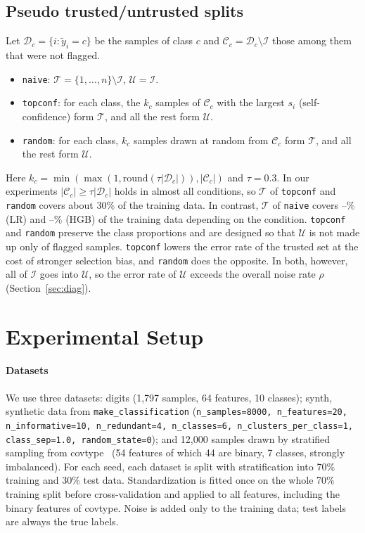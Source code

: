 \documentclass[a4paper,10pt]{article}
\newcommand{\method}[1]{\texttt{#1}}
\begin{document}
\subsection{Pseudo trusted/untrusted splits}\label{sec:split}
Let $\mathcal{D}_c = \{i : \tilde{y}_i = c\}$ be the samples of class $c$ and $\mathcal{C}_c = \mathcal{D}_c \setminus \mathcal{I}$ those among them that were not flagged.
\begin{itemize}
  \item \method{naive}: $\mathcal{T} = \{1,\dots,n\} \setminus \mathcal{I}$, $\mathcal{U} = \mathcal{I}$.
  \item \method{topconf}: for each class, the $k_c$ samples of $\mathcal{C}_c$ with the largest $s_i$ (self-confidence) form $\mathcal{T}$, and all the rest form $\mathcal{U}$.
  \item \method{random}: for each class, $k_c$ samples drawn at random from $\mathcal{C}_c$ form $\mathcal{T}$, and all the rest form $\mathcal{U}$.
\end{itemize}
Here $k_c = \min(\max(1, \mathrm{round}(\tau |\mathcal{D}_c|)), |\mathcal{C}_c|)$ and $\tau = 0.3$.
In our experiments $|\mathcal{C}_c| \geq \tau |\mathcal{D}_c|$ holds in almost all conditions, so $\mathcal{T}$ of \method{topconf} and \method{random} covers about 30\% of the training data.
In contrast, $\mathcal{T}$ of \method{naive} covers \NaiveTSizeMinLR--\NaiveTSizeMaxLR\% (LR) and \NaiveTSizeMinHGB--\NaiveTSizeMaxHGB\% (HGB) of the training data depending on the condition.
\method{topconf} and \method{random} preserve the class proportions and are designed so that $\mathcal{U}$ is not made up only of flagged samples.
\method{topconf} lowers the error rate of the trusted set at the cost of stronger selection bias, and \method{random} does the opposite.
In both, however, all of $\mathcal{I}$ goes into $\mathcal{U}$, so the error rate of $\mathcal{U}$ exceeds the overall noise rate $\rho$ (Section~\ref{sec:diag}).

\section{Experimental Setup}

\paragraph{Datasets}
We use three datasets:
digits (1,797 samples, 64 features, 10 classes);
synth, synthetic data from \texttt{make\_classification} (\texttt{n\_samples=8000, n\_features=20, n\_informative=10, n\_redundant=4, n\_classes=6, n\_clusters\_per\_class=1, class\_sep=1.0, random\_state=0});
and 12,000 samples drawn by stratified sampling from covtype~\cite{blackard1999covtype} (54 features of which 44 are binary, 7 classes, strongly imbalanced).
For each seed, each dataset is split with stratification into 70\% training and 30\% test data.
Standardization is fitted once on the whole 70\% training split before cross-validation and applied to all features, including the binary features of covtype.
Noise is added only to the training data; test labels are always the true labels.
\end{document}
